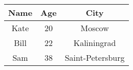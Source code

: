 \documentclass{article}
\begin{document}
\begin{center}
\begin{tabular}{|c|c|c|}
\hline
Name & Age & City \\
\hline
Kate & 20 & Moscow \\
\hline
Bill & 22 & Kaliningrad \\
\hline
Sam & 38 & Saint-Petersburg \\
\hline
\end{tabular}
\end{center}
\end{document}
